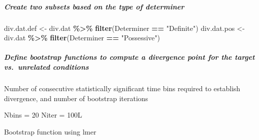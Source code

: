 \documentclass[
]{article}
\newenvironment{Shaded}{\begin{snugshade}}{\end{snugshade}}
\newcommand{\DataTypeTok}[1]{\textcolor[rgb]{0.13,0.29,0.53}{#1}}
\newcommand{\DecValTok}[1]{\textcolor[rgb]{0.00,0.00,0.81}{#1}}
\newcommand{\FunctionTok}[1]{\textcolor[rgb]{0.13,0.29,0.53}{\textbf{#1}}}
\newcommand{\NormalTok}[1]{#1}
\newcommand{\OtherTok}[1]{\textcolor[rgb]{0.56,0.35,0.01}{#1}}
\newcommand{\SpecialCharTok}[1]{\textcolor[rgb]{0.81,0.36,0.00}{\textbf{#1}}}
\newcommand{\StringTok}[1]{\textcolor[rgb]{0.31,0.60,0.02}{#1}}
\begin{document}
\subparagraph{Create two subsets based on the type of
determiner}\label{create-two-subsets-based-on-the-type-of-determiner}

\begin{Shaded}
\begin{Highlighting}[]
\NormalTok{div.dat.def }\OtherTok{\textless{}{-}}\NormalTok{ div.dat }\SpecialCharTok{\%\textgreater{}\%} \FunctionTok{filter}\NormalTok{(Determiner }\SpecialCharTok{==} \StringTok{"Definite"}\NormalTok{)}
\NormalTok{div.dat.pos }\OtherTok{\textless{}{-}}\NormalTok{ div.dat }\SpecialCharTok{\%\textgreater{}\%} \FunctionTok{filter}\NormalTok{(Determiner }\SpecialCharTok{==} \StringTok{"Possessive"}\NormalTok{)}
\end{Highlighting}
\end{Shaded}

\subparagraph{Define bootstrap functions to compute a divergence point
for the target vs.~unrelated
conditions}\label{define-bootstrap-functions-to-compute-a-divergence-point-for-the-target-vs.-unrelated-conditions}

Number of consecutive statistically significant time bins required to
establish divergence, and number of bootstrap iterations

\begin{Shaded}
\begin{Highlighting}[]
\NormalTok{Nbins }\OtherTok{=} \DecValTok{20}
\NormalTok{Niter }\OtherTok{=} \DecValTok{100}\DataTypeTok{L}
\end{Highlighting}
\end{Shaded}

Bootstrap function using lmer
\end{document}
